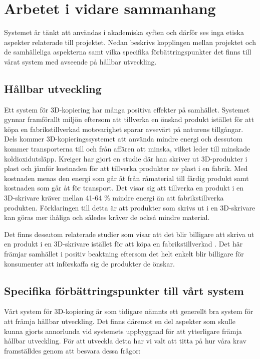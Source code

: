\section{Arbetet i vidare sammanhang}
\label{sec:work-wider-context}

Systemet är tänkt att användas i akademiska syften och därför ses inga etiska aspekter relaterade till projektet. Nedan beskrivs kopplingen mellan projektet och de samhälleliga aspekterna samt vilka specifika förbättringspunkter det finns till vårat system med avseende på hållbar utveckling.

\subsection{Hållbar utveckling}
\label{disc:hållbar_utveckling}
Ett system för 3D-kopiering har många positiva effekter på samhället. Systemet gynnar framförallt miljön eftersom att tillverka en önskad produkt istället för att köpa en fabrikstillverkad motsvarighet sparar avsevärt på naturens tillgångar. Dels kommer 3D-kopieringssystemet att använda mindre energi och dessutom kommer transporterna till och från affären att minska, vilket leder till minskade koldioxidutsläpp. Kreiger \cite{kreiger2013environmental} har gjort en studie där han skriver ut 3D-produkter i plast och jämför kostnaden för att tillverka produkter av plast i en fabrik. Med kostnaden menas den energi som går åt från råmaterial till färdig produkt samt kostnaden som går åt för transport. Det visar sig att tillverka en produkt i en 3D-skrivare kräver mellan 41-64 \% mindre energi än att fabrikstillverka produkten. Förklaringen till detta är att produkter som skrivs ut i en 3D-skrivare kan göras mer ihåliga och således kräver de också mindre material.

Det finns dessutom relaterade studier som visar att det blir billigare att skriva ut en produkt i en 3D-skrivare istället för att köpa en fabrikstillverkad \cite{wittbrodt2013life}. Det här främjar samhället i positiv beaktning eftersom det helt enkelt blir billigare för konsumenter att införskaffa sig de produkter de önskar.

\subsection{Specifika förbättringspunkter till vårt system}
Vårt system för 3D-kopiering är som tidigare nämnts ett generellt bra system för att främja hållbar utveckling. Det finns däremot en del aspekter som skulle kunna gjorts annorlunda vid systemets uppbyggnad för att ytterligare främja hållbar utveckling. För att utveckla detta har vi valt att titta på hur våra krav framställdes genom att besvara dessa frågor:

